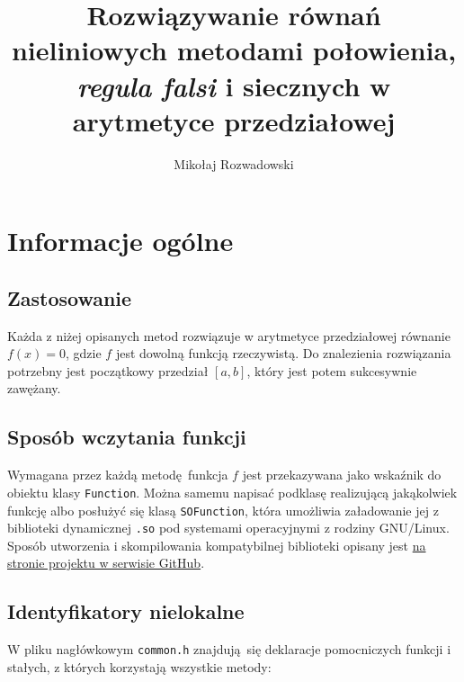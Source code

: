 \documentclass[12pt]{article}
\title{Rozwiązywanie równań nieliniowych metodami połowienia, \textsl{regula falsi} i siecznych w arytmetyce przedziałowej}
\author{Mikołaj Rozwadowski}
\begin{document}
	\maketitle

	\section{Informacje ogólne}
		\subsection{Zastosowanie}
			Każda z niżej opisanych metod rozwiązuje w arytmetyce przedziałowej
			równanie $f(x) = 0$, gdzie $f$ jest dowolną funkcją rzeczywistą.
			Do znalezienia rozwiązania potrzebny jest początkowy przedział $[a, b]$,
			który jest potem sukcesywnie zawężany.

		\subsection{Sposób wczytania funkcji}
			Wymagana przez każdą metodę funkcja $f$ jest przekazywana jako wskaźnik
			do obiektu klasy \texttt{Function}. Można samemu napisać podklasę realizującą
			jakąkolwiek funkcję albo posłużyć się klasą \texttt{SOFunction},
			która umożliwia załadowanie jej z biblioteki dynamicznej \texttt{.so}
			pod systemami operacyjnymi z rodziny GNU/Linux.
			Sposób utworzenia i skompilowania kompatybilnej biblioteki opisany jest
			\href{https://github.com/hejmsdz/NonLinear/tree/master/functions}{na stronie projektu w serwisie GitHub}.

		\subsection{Identyfikatory nielokalne}\label{nonlocal}
			W pliku nagłówkowym \texttt{common.h} znajdują się deklaracje
			pomocniczych funkcji i stałych, z których korzystają wszystkie metody:
\end{document}
